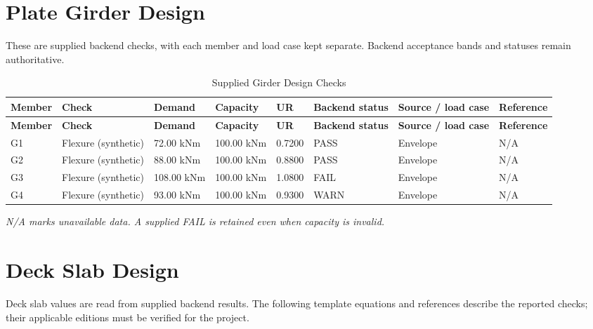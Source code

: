 \documentclass[12pt,a4paper]{report}
\numberwithin{table}{chapter}
\numberwithin{figure}{chapter}
\newcommand{\ReportTableSetup}{%
  \setlength{\tabcolsep}{3.0pt}%
  \renewcommand{\arraystretch}{1.18}%
  \setlength{\arrayrulewidth}{0.4pt}\setlength{\extrarowheight}{0.5pt}%
  \setlength{\LTleft}{\fill}\setlength{\LTright}{\fill}%
  \setlength{\LTpre}{4pt}\setlength{\LTpost}{8pt}}
\newcommand{\ReportTableFont}{\small}
\begin{document}
\section{Plate Girder Design}\label{sec:plate-girder}
These are supplied backend checks, with each member and load case kept separate. Backend acceptance bands and statuses remain authoritative.
\begingroup
\ReportTableSetup
\ReportTableFont
\begin{longtable}{|L{1.6122cm}|L{2.6869cm}|L{1.7913cm}|L{1.7913cm}|C{1.0748cm}|C{1.7913cm}|L{2.2391cm}|L{2.1496cm}|}
\caption{Supplied Girder Design Checks}\\\hline
\textbf{Member} & \textbf{Check} & \textbf{Demand} & \textbf{Capacity} & \textbf{UR} & \textbf{Backend status} & \textbf{Source / load case} & \textbf{Reference} \\ \hline
\endfirsthead
\hline
\textbf{Member} & \textbf{Check} & \textbf{Demand} & \textbf{Capacity} & \textbf{UR} & \textbf{Backend status} & \textbf{Source / load case} & \textbf{Reference} \\ \hline
\endhead
\hline
\endfoot
\hline
\endlastfoot

G1 & Flexure (synthetic) & 72.00 kNm & 100.00 kNm & 0.7200 & PASS & Envelope & N/A \\ \hline
G2 & Flexure (synthetic) & 88.00 kNm & 100.00 kNm & 0.8800 & PASS & Envelope & N/A \\ \hline
G3 & Flexure (synthetic) & 108.00 kNm & 100.00 kNm & 1.0800 & FAIL & Envelope & N/A \\ \hline
G4 & Flexure (synthetic) & 93.00 kNm & 100.00 kNm & 0.9300 & WARN & Envelope & N/A \\ \hline
\end{longtable}
\endgroup
\textit{N/A marks unavailable data. A supplied FAIL is retained even when capacity is invalid.}


\section{Deck Slab Design}
\label{sec:deck-design}

Deck slab values are read from supplied backend results. The following template equations and references describe the reported checks; their applicable editions must be verified for the project.
\end{document}
